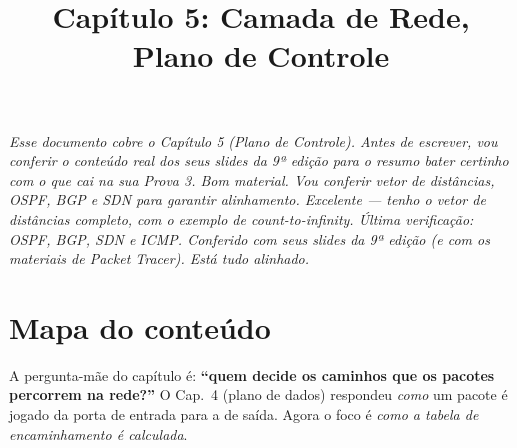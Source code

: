 \documentclass[11pt,a4paper]{article}
\title{Capítulo 5: Camada de Rede, Plano de Controle}
\author{}
\date{}
\begin{document}
\maketitle
\thispagestyle{fancy}

\noindent\textit{Esse documento cobre o {Capítulo 5 (Plano de Controle)}. Antes de escrever, vou conferir o conteúdo real dos seus slides da 9ª edição para o resumo bater certinho com o que cai na sua Prova 3. Bom material. Vou conferir vetor de distâncias, OSPF, BGP e SDN para garantir alinhamento. Excelente --- tenho o vetor de distâncias completo, com o exemplo de count-to-infinity. Última verificação: OSPF, BGP, SDN e ICMP. Conferido com seus slides da 9ª edição (e com os materiais de Packet Tracer). Está tudo alinhado.}

\section*{Mapa do conteúdo}

A pergunta-mãe do capítulo é: \textbf{``quem decide os caminhos que os pacotes percorrem na rede?''} O Cap.~4 (plano de dados) respondeu \textit{como} um pacote é jogado da porta de entrada para a de saída. Agora o foco é \textit{como a tabela de encaminhamento é calculada}.
\end{document}
